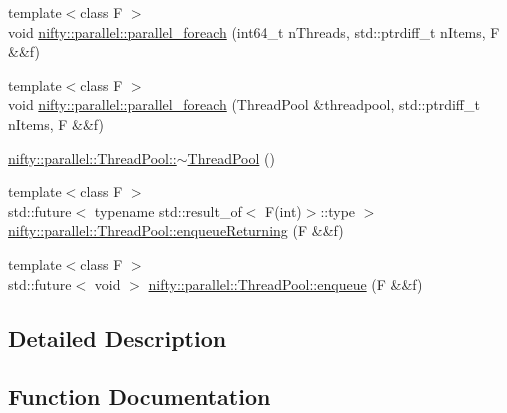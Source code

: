 \begin{DoxyCompactItemize}
\item 
{\footnotesize template$<$class F $>$ }\\void \hyperlink{group__ParallelProcessing_ga900cd2b90fda714e21082d5ba897f240}{nifty\+::parallel\+::parallel\+\_\+foreach} (int64\+\_\+t n\+Threads, std\+::ptrdiff\+\_\+t n\+Items, F \&\&f)
\item 
{\footnotesize template$<$class F $>$ }\\void \hyperlink{group__ParallelProcessing_gaf78ef995aaa44624da018033fd03beeb}{nifty\+::parallel\+::parallel\+\_\+foreach} (Thread\+Pool \&threadpool, std\+::ptrdiff\+\_\+t n\+Items, F \&\&f)
\item 
\hyperlink{group__ParallelProcessing_ga77c519ec32559623c64d61f532c570b8}{nifty\+::parallel\+::\+Thread\+Pool\+::$\sim$\+Thread\+Pool} ()
\item 
{\footnotesize template$<$class F $>$ }\\std\+::future$<$ typename std\+::result\+\_\+of$<$ F(int)$>$\+::type $>$ \hyperlink{group__ParallelProcessing_ga5ffeb64ca8f60c37ad2db97bf80b05af}{nifty\+::parallel\+::\+Thread\+Pool\+::enqueue\+Returning} (F \&\&f)
\item 
{\footnotesize template$<$class F $>$ }\\std\+::future$<$ void $>$ \hyperlink{group__ParallelProcessing_ga030f79847ecd6a609877dd5f997ac875}{nifty\+::parallel\+::\+Thread\+Pool\+::enqueue} (F \&\&f)
\end{DoxyCompactItemize}


\subsection{Detailed Description}


\subsection{Function Documentation}
\hypertarget{group__ParallelProcessing_ga030f79847ecd6a609877dd5f997ac875}{}
